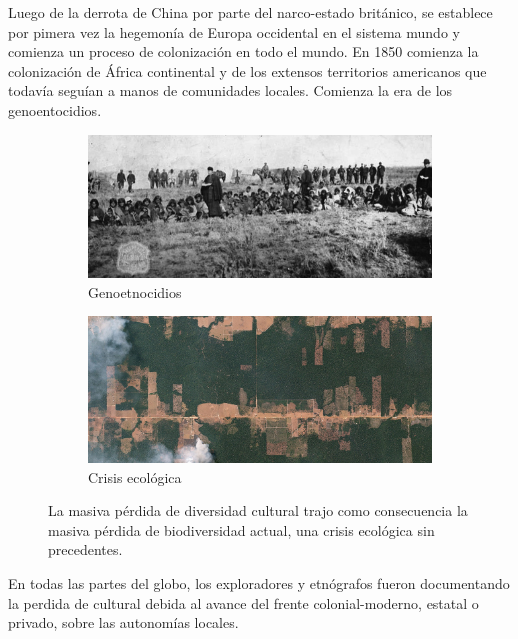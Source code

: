 \documentclass[a4paper,10pt]{book}
\theoremstyle{definition}1
\begin{document}

Luego de la derrota de China por parte del narco-estado británico, se establece por pimera vez la hegemonía de Europa occidental en el sistema mundo y comienza un proceso de colonización en todo el mundo.
En 1850 comienza la colonización de África continental y de los extensos territorios americanos que todavía seguían a manos de comunidades locales.
Comienza la era de los genoentocidios.
\begin{figure}[ht!]
    \centering
    \begin{subfigure}[b]{0.48\textwidth}
    \includegraphics[width=\linewidth]{static/genocidio_patagonia}
    \caption{Genoetnocidios}
    \label{fig:genocidio_patagonia}
    \end{subfigure}
    \begin{subfigure}[b]{0.47\textwidth}
    \includegraphics[width=\linewidth]{static/deforestation-brazil}
    \caption{Crisis ecológica}
    \label{fig:deforestation-brazil}
    \end{subfigure}
    \caption{
    La masiva pérdida de diversidad cultural trajo como consecuencia la masiva pérdida de biodiversidad actual, una crisis ecológica sin precedentes.
    }
    \label{fig:cultural-lose}
\end{figure}
En todas las partes del globo, los exploradores y etnógrafos fueron documentando la perdida de cultural debida al avance del frente colonial-moderno, estatal o privado, sobre las autonomías locales.
\end{document}
